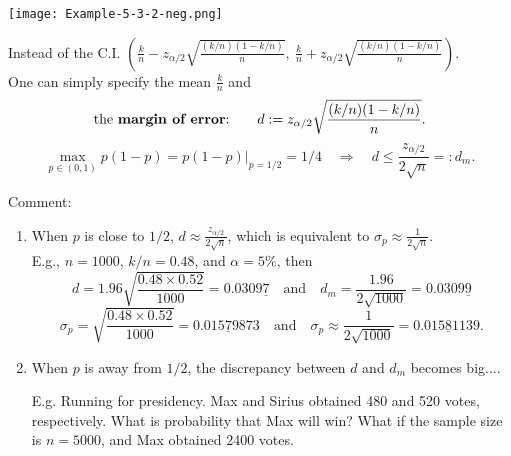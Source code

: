 \begin{frame}
 \texttt{[image: Example-5-3-2-neg.png]}
\end{frame}
\begin{frame}
Instead of the C.I. $\left(\frac{k}{n}-z_{\alpha/2} \sqrt{\frac{(k/n)(1-k/n)}{n}},\:\frac{k}{n}+z_{\alpha/2} \sqrt{\frac{(k/n)(1-k/n)}{n}}\right)$.\\[1em]
One can simply specify the mean $\displaystyle \frac{k}{n}$ and
\[
\text{the {\bf margin of error}:}\qquad  d:=z_{\alpha/2} \sqrt{\frac{(k/n)(1-k/n)}{n}}.
\]
\vfill
\[
\max_{p\in(0,1)} p(1-p)  = p(1-p)\bigg|_{p=1/2} = 1/4 \quad \Longrightarrow \quad d\le \frac{z_{\alpha/2}}{2\sqrt{n}}=:d_m.
\]
\end{frame}
\begin{frame}
 Comment:
 \begin{enumerate}
  \item When $p$ is close to $1/2$, $d\approx \frac{z_{\alpha/2}}{2\sqrt{n}}$, which is equivalent to $\sigma_p\approx \frac{1}{2\sqrt{n}}$.\\[1em]
 E.g., $n=1000$, $k/n=0.48$, and $\alpha=5\%$, then
 \[
 d=1.96\sqrt{\frac{0.48\times 0.52}{1000}} = 0.0309\underline{7} \quad \text{and}\quad
 d_m = \frac{1.96}{2\sqrt{1000}}= 0.0309\underline{9}
 \]
 \[
 \sigma_p = \sqrt{\frac{0.48\times 0.52}{1000}} =  0.015\underline{7}9873
 \quad \text{and}\quad
 \sigma_p \approx \frac{1}{2\sqrt{1000}}= 0.015\underline{8}1139.
 \]
 \vfill
 \item When $p$ is away from $1/2$, the discrepancy between $d$ and $d_m$ becomes big....
\end{enumerate}
\end{frame}
\begin{frame}
 \begin{enumerate}
  \item[E.g. ]  Running for presidency. Max and Sirius obtained 480 and 520 votes, respectively. What is probability that Max will win?
  \vfill
  What if the sample size is $n=5000$, and Max obtained 2400 votes.
 \end{enumerate}
\end{frame}
